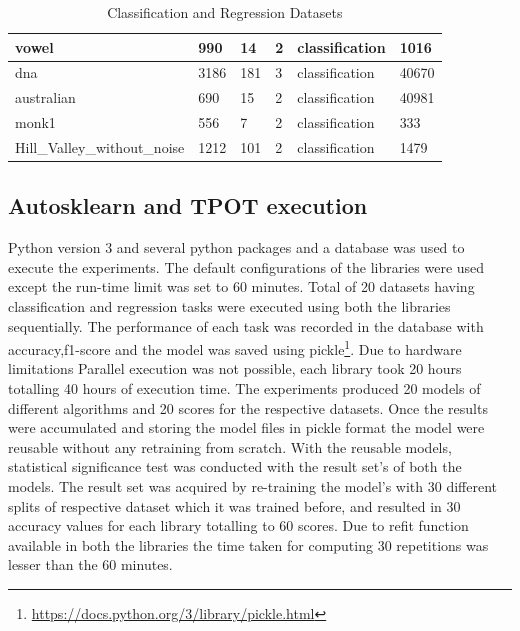 \begin{table}[]
\begin{tabular}{|l|l|l|l|l|l|}
vowel                           & 990       & 14       & 2       & classification & 1016       \\ \hline
dna                             & 3186      & 181      & 3       & classification & 40670      \\ \hline
australian                      & 690       & 15       & 2       & classification & 40981      \\ \hline
monk1                           & 556       & 7        & 2       & classification & 333        \\ \hline
Hill\_Valley\_without\_noise    & 1212      & 101      & 2       & classification & 1479       \\ \hline
\end{tabular}
\caption{Classification and Regression Datasets}
\end{table}

\subsection{Autosklearn and TPOT execution}
Python version 3 and several python packages and a database was used to execute the experiments. The default configurations of the libraries were used except the run-time limit was set to 60 minutes. Total of 20 datasets having classification and regression tasks were executed using both the libraries sequentially. The performance of each task was recorded in the database with accuracy,f1-score and the model was saved using pickle\footnote{\url{https://docs.python.org/3/library/pickle.html}}. Due to hardware limitations Parallel execution was not possible, each library took 20 hours totalling 40 hours of execution time. The experiments produced 20 models of different algorithms and 20 scores for the respective datasets. Once the results were accumulated and storing the model files in pickle format the model were reusable without any retraining from scratch. With the reusable models, statistical significance test was conducted with the result set's of both the models. The result set was acquired by re-training the model's with 30 different splits of respective dataset which it was trained before, and resulted in 30 accuracy values for each library totalling to 60 scores. Due to refit function available in both the libraries the time taken for computing 30 repetitions was lesser than the 60 minutes.

